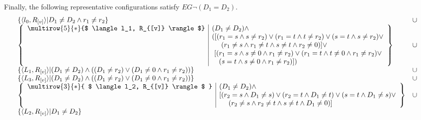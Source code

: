 Finally, the following representative configurations satisfy $EG \neg
(D_1 = D_2)$.
\begin{equation*}
  \begin{array}{ll}
    \{ \langle l_0, R_{[v]} \rangle | D_1 \neq D_2 \wedge r_1 \neq r_2 \} & 
    \cup \\
    \left\{
      \begin{array}{l|l}
        \multirow{5}{*}{$ \langle l_1, R_{[v]} \rangle$} & 
        (D_1 \neq D_2) \wedge\\
        &
        ([(r_1 = s \wedge s \neq r_2) \vee 
          (r_1 = t \wedge t \neq r_2) \vee
          (s = t \wedge s \neq r_2) \vee\\
        & \ \ \ \ 
          (r_1 \neq s \wedge r_1 \neq t \wedge s \neq t \wedge r_2 \neq 0)]
          \vee\\
        &
        \ [(r_1 = s \wedge s \neq 0 \wedge r_1 \neq r_2) \vee
           (r_1 = t \wedge t \neq 0 \wedge r_1 \neq r_2) \vee \\
        &  \ \ \ 
           (s = t \wedge s \neq 0 \wedge r_1 \neq r_2)])
      \end{array}
    \right\} & 
    \cup \\
    \{ \langle L_1, R_{[v]} \rangle | (D_1 \neq D_2) \wedge 
                ((D_1 \neq r_2) \vee (D_1 \neq 0 \wedge r_1 \neq r_2))\} & 
    \cup\\
    \{ \langle L_3, R_{[v]} \rangle | (D_1 \neq D_2) \wedge 
                ((D_1\neq r_2) \vee (D_1 \neq 0 \wedge r_1 \neq r_2))\} &
    \cup\\
    \left\{
    \begin{array}{l|l}
      \multirow{3}{*}{ $ \langle l_2, R_{[v]} \rangle $ } & 
      (D_1 \neq D_2) \wedge\\
      &
      [(r_2 = s \wedge D_1 \neq s) \vee
       (r_2 = t \wedge D_1 \neq t) \vee
       (s = t \wedge D_1 \neq s) \vee\\
      & \ \ \ \ 
       (r_2 \neq s \wedge r_2 \neq t \wedge s \neq t \wedge D_1\neq 0)]
    \end{array}
    \right\} &
    \cup \\
    \{ \langle L_2, R_{[v]} \rangle | D_1 \neq D_2\}
  \end{array}
\end{equation*}

